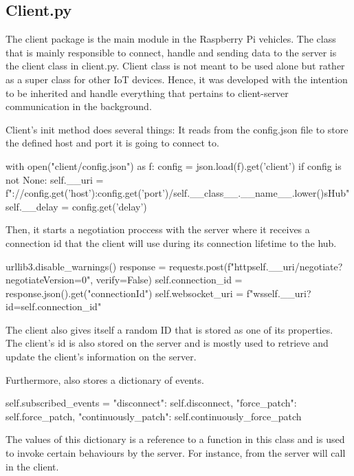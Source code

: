 \subsection{Client.py}
The client package is the main module in the Raspberry Pi vehicles. The class that is mainly responsible to connect, handle and sending data to the server is the client class in client.py. Client class is not meant to be used alone but rather as a super class for other IoT devices. Hence, it was developed with the intention to be inherited and handle everything that pertains to client-server communication in the background.

Client's init method does several things: It reads from the config.json file to store the defined host and port it is going to connect to.
\begin{python}
with open("client/config.json") as f:
	config = json.load(f).get('client')
	if config is not None:
		self.__uri = f"://{config.get('host')}:{config.get('port')}/{self.__class__.__name__.lower()}sHub"
		self.__delay = config.get('delay')
\end{python}

Then, it starts a negotiation proccess with the server where it receives a connection id that the client will use during its connection lifetime to the hub.

\begin{python}
urllib3.disable_warnings()
response = requests.post(f"http{self.__uri}/negotiate?negotiateVersion=0", verify=False)
self.connection_id = response.json().get("connectionId")
self.websocket_uri = f"ws{self.__uri}?id={self.connection_id}"
\end{python}

The client also gives itself a random ID that is stored as one of its properties. The client's id is also stored on the server and is mostly used to retrieve and update the client's information on the server.

Furthermore,  also stores a dictionary of events.
\begin{python}
self.subscribed_events = {
	"disconnect": self.disconnect,
	"force_patch": self.force_patch,
	"continuously_patch": self.continuously_force_patch
}
\end{python}

The values of this dictionary is a reference to a function in this class and is used to invoke certain behaviours by the server. For instance,  from the server will call  in the client. 
